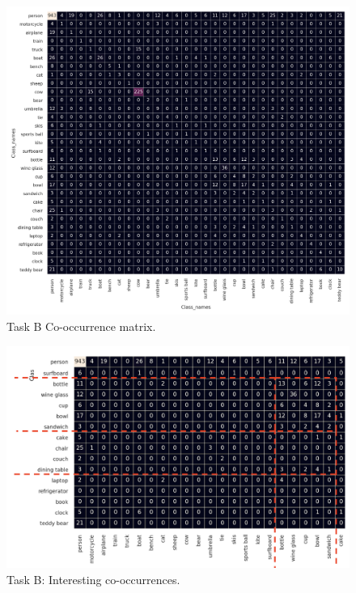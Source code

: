 \documentclass[11pt,a4paper,twocolumn,twoside]{article}
\begin{document}
\begin{figure}[hbt]
    \includegraphics[width=\textwidth,height=\textheight,keepaspectratio]{Resources/Images/task_b_cooc.png}
    \caption{Task B Co-occurrence matrix.}
    \label{fig:task_b_cooc}
\end{figure}

\begin{figure}[hbt]
    \includegraphics[width=\textwidth,height=\textheight,keepaspectratio]{Resources/Images/task_b_interesting.png}
    \caption{Task B: Interesting co-occurrences.}
    \label{fig:task_b_interesting}
\end{figure}
\end{document}
